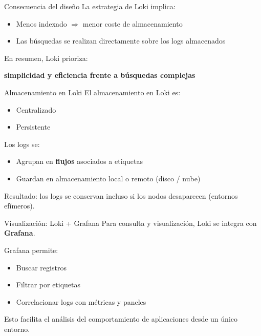 \documentclass{beamer}
\begin{document}
\begin{frame}{Consecuencia del diseño}
La estrategia de Loki implica:
\begin{itemize}
    \item Menos indexado $\Rightarrow$ menor coste de almacenamiento
    \item Las búsquedas se realizan directamente sobre los logs almacenados
\end{itemize}

\vspace{0.3cm}
En resumen, Loki prioriza:
\begin{center}
\textbf{simplicidad y eficiencia frente a búsquedas complejas}
\end{center}
\end{frame}

\begin{frame}{Almacenamiento en Loki}
El almacenamiento en Loki es:
\begin{itemize}
    \item Centralizado
    \item Persistente
\end{itemize}

\vspace{0.3cm}
Los logs se:
\begin{itemize}
    \item Agrupan en \textbf{flujos} asociados a etiquetas
    \item Guardan en almacenamiento local o remoto (disco / nube)
\end{itemize}

\vspace{0.3cm}
Resultado: los logs se conservan incluso si los nodos desaparecen (entornos efímeros).
\end{frame}

\begin{frame}{Visualización: Loki + Grafana}
Para consulta y visualización, Loki se integra con \textbf{Grafana}.

\vspace{0.3cm}
Grafana permite:
\begin{itemize}
    \item Buscar registros
    \item Filtrar por etiquetas
    \item Correlacionar logs con métricas y paneles
\end{itemize}

\vspace{0.3cm}
Esto facilita el análisis del comportamiento de aplicaciones desde un único entorno.
\end{frame}
\end{document}
